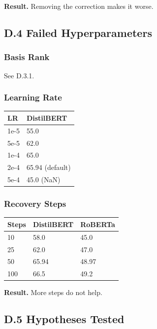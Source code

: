 \textbf{Result.} Removing the correction makes it worse.

\subsection{D.4 Failed Hyperparameters}

\subsubsection{Basis Rank}

See D.3.1.

\subsubsection{Learning Rate}

\begin{table}[H]
\centering
\small
\begin{tabular}{ll}
\toprule
\textbf{LR} & \textbf{DistilBERT} \\
\midrule
1e-5 & 55.0 \\
5e-5 & 62.0 \\
1e-4 & 65.0 \\
2e-4 & 65.94 (default) \\
5e-4 & 45.0 (NaN) \\
\bottomrule
\end{tabular}
\end{table}

\subsubsection{Recovery Steps}

\begin{table}[H]
\centering
\small
\begin{tabular}{lll}
\toprule
\textbf{Steps} & \textbf{DistilBERT} & \textbf{RoBERTa} \\
\midrule
10 & 58.0 & 45.0 \\
25 & 62.0 & 47.0 \\
50 & 65.94 & 48.97 \\
100 & 66.5 & 49.2 \\
\bottomrule
\end{tabular}
\end{table}

\textbf{Result.} More steps do not help.

\subsection{D.5 Hypotheses Tested}

